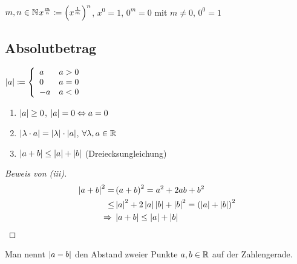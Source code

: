 \begin{definition}
    $m,n\in\mathbb{N}$\quad $x^\frac{m}{n}\coloneqq \left(x^\frac{1}{m}\right)^n$, $x^0 = 1$, $0^m = 0$ mit $m\neq 0$, $0^0 = 1$
\end{definition}

\subsection{Absolutbetrag}

\begin{definition}[Betrag]
    $\left|a\right| \coloneqq \left\{ \begin{array}{lr}
                                    a  & a>0 \\
                                    0  & a=0 \\
                                    -a & a<0
    \end{array}\right.$
\end{definition}

\begin{satz}
    \theoremescape
    \begin{enumerate}[label=(\roman*)]
        \item $\left|a\right| \geq 0$, $\left|a\right| = 0 \Leftrightarrow{} a = 0$
        \item $\left|\lambda\cdot a\right| = \left|\lambda\right|\cdot\left|a\right|$, $\forall \lambda, a \in \mathbb{R}$
        \item $\left|a+b\right|\leq \left|a\right|+\left|b\right|$ (Dreiecksungleichung) %
    \end{enumerate}
    \begin{proof}[Beweis von (iii)]
        \begin{align*}
            \left|a+b\right|^2 = &\left(a+b\right)^2 = a^2 + 2ab + b^2\\
            \leq &\left|a\right|^2 + 2\left|a\right|\left|b\right| + \left|b\right|^2 = \left(\left|a\right|+\left|b\right|\right)^2\\
            \Rightarrow{} &\left|a+b\right|\leq\left|a\right|+\left|b\right|\qedhere
        \end{align*}
    \end{proof}
\end{satz}

\begin{definition}
    Man nennt $\left|a-b\right|$ den Abstand zweier Punkte $a,b\in\mathbb{R}$ auf der Zahlengerade.
\end{definition}

